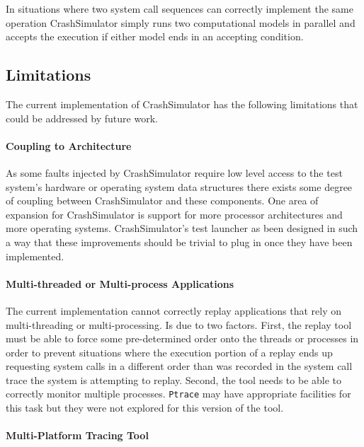     
   In situations where two system call sequences can correctly implement the same operation CrashSimulator simply runs
   two computational models in parallel and accepts the execution if either model ends in an accepting condition. 

    \subsection{Limitations}

        The current implementation of CrashSimulator has the following limitations that could be addressed by future work.

        \paragraph{Coupling to Architecture}

        As some faults injected by CrashSimulator require low level access to the test system's hardware or operating
        system data structures there exists some degree of coupling between CrashSimulator and these components. One
        area of expansion for CrashSimulator is support for more processor architectures and more operating systems.
        CrashSimulator's test launcher as been designed in such a way that these improvements should be trivial to plug
        in once they have been implemented.

        \paragraph{Multi-threaded or Multi-process Applications}

        The current implementation cannot correctly replay applications that rely on multi-threading or
        multi-processing.  Is due to two factors.  First, the replay tool must be able to force some pre-determined
        order onto the threads or processes in order to prevent situations where the execution portion of a replay ends
        up requesting system calls in a different order than was recorded in the system call trace the system is
        attempting to replay.  Second, the tool needs to be able to correctly monitor multiple processes. {\tt Ptrace}
        may have appropriate facilities for this task but they were not explored for this version of the tool.

        \paragraph{Multi-Platform Tracing Tool}

